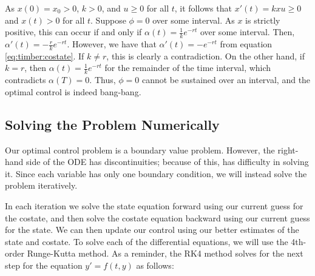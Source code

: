 As $x(0) = x_{0} > 0$, $k > 0$, and $u \geq 0$ for all $t$, it follows that $x'(t) = kxu \geq 0$ and $x(t) > 0$ for all $t$.
Suppose $\phi = 0$ over some interval.
As $x$ is strictly positive, this can occur if and only if $\alpha(t) = \frac{1}{k}e^{-rt}$ over some interval. Then, $\alpha '(t) = -\frac{r}{k}e^{-rt}$.
However, we have that $\alpha '(t) = -e^{-rt}$ from equation \eqref{eq:timber:costate}.
If $k \neq r$, this is clearly a contradiction.
On the other hand, if $k = r$, then $\alpha(t) = \frac{1}{k}e^{-rt}$ for the remainder of the time interval, which contradicts $\alpha(T) = 0$. %
Thus, $\phi = 0$ cannot be sustained over an interval, and the optimal control is indeed bang-bang.

\subsection*{Solving the Problem Numerically}
Our optimal control problem is a boundary value problem.
However, the right-hand side of the ODE has discontinuities; because of this,  has difficulty in solving it.
Since each variable has only one boundary condition, we will instead solve the problem iteratively.

In each iteration we solve the state equation forward using our current guess for the costate, and then solve the costate equation backward using our current guess for the state.
We can then update our control using our better estimates of the state and costate.
To solve each of the differential equations, we will use the 4th-order Runge-Kutta method.
As a reminder, the RK4 method solves for the next step for the equation \(y'=f(t,y)\) as follows:

